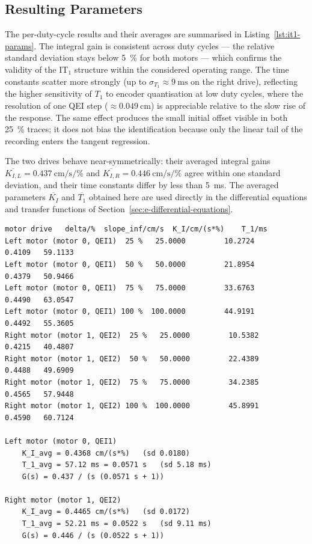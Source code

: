\documentclass[12pt, oneside, a4paper]{scrreprt}
\begin{document}
            \subsection{Resulting Parameters}

            The per-duty-cycle results and their averages are summarised in Listing~\ref{lst:it1-params}. The integral gain is consistent across duty cycles --- the relative standard deviation stays below \qty{5}{\percent} for both motors --- which confirms the validity of the IT$_1$ structure within the considered operating range. The time constants scatter more strongly (up to $\sigma_{T_1} \approx \qty{9}{\milli\second}$ on the right drive), reflecting the higher sensitivity of $T_1$ to encoder quantisation at low duty cycles, where the resolution of one QEI step ($\approx \qty{0.049}{\centi\metre}$) is appreciable relative to the slow rise of the response. The same effect produces the small initial offset visible in both \qty{25}{\percent} traces; it does not bias the identification because only the linear tail of the recording enters the tangent regression.

            The two drives behave near-symmetrically: their averaged integral gains $\overline{K_{I,L}} = \qty{0.437}{\centi\metre\per\second\per\percent}$ and $\overline{K_{I,R}} = \qty{0.446}{\centi\metre\per\second\per\percent}$ agree within one standard deviation, and their time constants differ by less than \qty{5}{\milli\second}. The averaged parameters $\overline{K_I}$ and $\overline{T_1}$ obtained here are used directly in the differential equations and transfer functions of Section~\ref{sec:e-differential-equations}.

            \begin{lstlisting}[caption={Identified IT$_1$ parameters per duty cycle and averaged values for the left and right drive.},label={lst:it1-params}]
motor drive   delta/%  slope_inf/cm/s  K_I/cm/(s*%)    T_1/ms
Left motor (motor 0, QEI1)  25 %   25.0000         10.2724        0.4109   59.1133
Left motor (motor 0, QEI1)  50 %   50.0000         21.8954        0.4379   50.9466
Left motor (motor 0, QEI1)  75 %   75.0000         33.6763        0.4490   63.0547
Left motor (motor 0, QEI1) 100 %  100.0000         44.9191        0.4492   55.3605
Right motor (motor 1, QEI2)  25 %   25.0000         10.5382        0.4215   40.4807
Right motor (motor 1, QEI2)  50 %   50.0000         22.4389        0.4488   49.6909
Right motor (motor 1, QEI2)  75 %   75.0000         34.2385        0.4565   57.9448
Right motor (motor 1, QEI2) 100 %  100.0000         45.8991        0.4590   60.7124

Left motor (motor 0, QEI1)
    K_I_avg = 0.4368 cm/(s*%)   (sd 0.0180)
    T_1_avg = 57.12 ms = 0.0571 s   (sd 5.18 ms)
    G(s) = 0.437 / (s (0.0571 s + 1))

Right motor (motor 1, QEI2)
    K_I_avg = 0.4465 cm/(s*%)   (sd 0.0172)
    T_1_avg = 52.21 ms = 0.0522 s   (sd 9.11 ms)
    G(s) = 0.446 / (s (0.0522 s + 1))
            \end{lstlisting}
\end{document}
